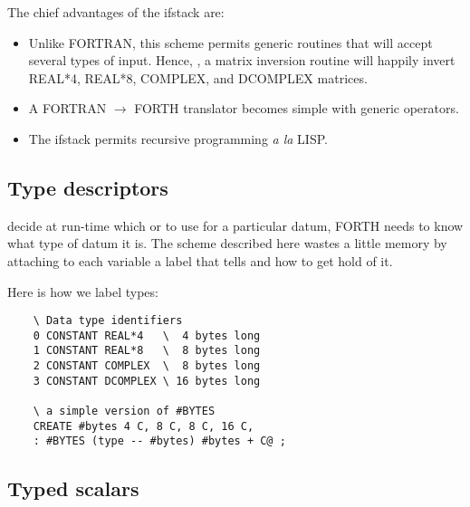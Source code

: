 The chief advantages of the ifstack are:
\begin{itemize}
    \item Unlike FORTRAN, this scheme permits generic routines that will accept several types of input. Hence, \eg, a matrix inversion routine will happily invert REAL*4, REAL*8, COMPLEX, and DCOMPLEX matrices.
    \item A FORTRAN $\rightarrow$ FORTH translator becomes simple with generic operators.
    \item The ifstack permits recursive programming \textit{a la} LISP.
\end{itemize}

\subsection{Type descriptors}
 decide at run-time which  or \regc{!} to use for a particular datum, FORTH needs to know what type of datum it is. The scheme described here wastes a little memory by attaching to each variable a label that tells  and  how to get hold of it.

Here is how we label types:
\begin{lstlisting}
    \ Data type identifiers
    0 CONSTANT REAL*4   \  4 bytes long
    1 CONSTANT REAL*8   \  8 bytes long
    2 CONSTANT COMPLEX  \  8 bytes long
    3 CONSTANT DCOMPLEX \ 16 bytes long

    \ a simple version of #BYTES
    CREATE #bytes 4 C, 8 C, 8 C, 16 C,
    : #BYTES (type -- #bytes) #bytes + C@ ;
\end{lstlisting}

\subsection{Typed scalars}
\label{sec:Typed_scalars}

